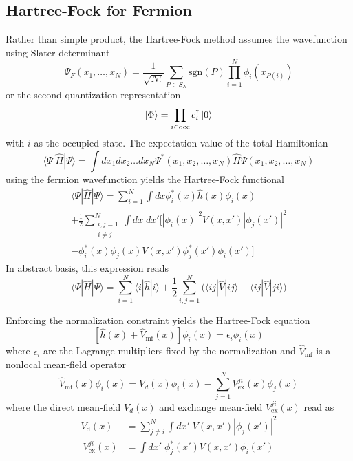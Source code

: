 \documentclass[../../../main.tex]{subfiles}
\begin{document}
\subsection{Hartree-Fock for Fermion}
Rather than simple product, the Hartree-Fock method assumes the wavefunction using Slater determinant
\begin{equation*}
  \Psi_F(x_1, \ldots, x_N)
  = \frac{1}{\sqrt{N!}} \sum_{P \in S_N} \text{sgn}(P) \prod_{i=1}^N \phi_i(x_{P(i)})
\end{equation*}
or the second quantization representation
\begin{equation*}
  \ket{\Phi }= \prod_{i \in \text{occ}} c ^\dagger_i \ket{0}
\end{equation*}
with $i$ as the occupied state.
The expectation value of the total Hamiltonian
\begin{equation*}
  \langle \Psi | \hat{H} | \Psi \rangle = \int dx_1 dx_2 \ldots dx_N \Psi^*(x_1, x_2, \ldots, x_N) \hat{H} \Psi(x_1, x_2, \ldots, x_N)
\end{equation*}
using the fermion wavefunction yields the Hartree-Fock functional
\begin{multline*}
  \langle \Psi | \hat{H} | \Psi \rangle
  = \sum_{i=1}^N \int dx\phi_i^*(x)\hat h(x)\phi_i(x) \\
  + \frac{1}{2}\sum_{\substack{i,j=1\\i\neq j}}^N \int dx\;dx' \Bigg[ |\phi_i(x)|^2V(x,x')|\phi_j(x')|^2 \\
    - \phi_i^*(x)\phi_j(x)V(x,x')\phi_j^*(x')\phi_i(x') \Bigg]
\end{multline*}
In abstract basis, this expression reads
\begin{equation*}
  \langle \Psi | \hat{H} | \Psi \rangle
  = \sum_{i=1}^{N}\langle i|\hat{h}|i\rangle + \frac{1}{2}\sum_{i,j=1}^{N}\big(\langle ij|\hat{V}|ij\rangle - \langle ij|\hat{V}|ji\rangle\big)
\end{equation*}

Enforcing the normalization constraint yields the Hartree-Fock equation
\begin{equation*}
  \left[\hat{h}(x)+\hat{V}_{\mathrm{mf}}(x)\right]\phi_i(x) =\epsilon_i\phi_i(x)
\end{equation*}
where $\epsilon_i$ are the Lagrange multipliers ﬁxed by the normalization and $\hat{V}_\text{mf}$ is a nonlocal mean-ﬁeld operator
\begin{equation*}
  \hat{V}_\text{mf}(x) \phi_i(x)
  =  V_d(x) \phi_i(x) - \sum_{j=1}^N V^{ji}_\text{ex}(x) \phi_j(x)
\end{equation*}
where the direct mean-ﬁeld ${V}_d(x)$ and exchange mean-field ${V}_\text{ex} ^{ji}(x)$ read as
\begin{align*}
  V_\text{d}(x)       & =  \sum_{j\neq i}^N \int dx'\; V(x,x')\left|\phi_j(x')\right|^2 \\\
  V_\text{ex}^{ji}(x) & =  \int dx'\; \phi_j^*(x')V(x,x')\phi_i(x')
\end{align*}
\end{document}
